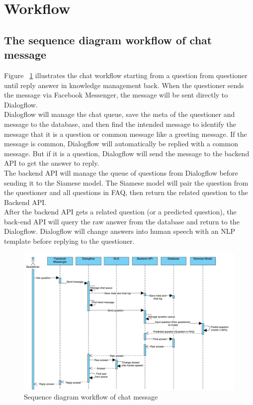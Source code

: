 \documentclass[12pt,oneside,openright,a4paper]{cpe-english-project}
\begin{document}
\pagebreak

\section{Workflow}
\subsection{The sequence diagram workflow of chat message}
Figure ~\ref*{fig:Sequence diagram workflow of chat message} illustrates the chat workflow starting from a question from questioner until reply answer in knowledge management back. When the questioner sends the message via Facebook Messenger, the message will be sent directly to Dialogflow.\\
Dialogflow will manage the chat queue, save the meta of the questioner and message to the database, and then find the intended message to identify the message that it is a question or common message like a greeting message. If the message is common, Dialogflow will automatically be replied with a common message. But if it is a question, Dialogflow will send the message to the backend API to get the answer to reply.\\
The backend API will manage the queue of questions from Dialogflow before sending it to the Siamese model. The Siamese model will pair the question from the questioner and all questions in FAQ, then return the related question to the Backend API.\\
After the backend API gets a related question (or a predicted question), the back-end API will query the raw answer from the database and return to the Dialogflow. Dialogflow will change answers into human speech with an NLP template before replying to the questioner.
\begin{figure}[!h]
	\includegraphics[width=14cm]{img/ch3/sequence diagram of chat message.jpg}
	\caption{Sequence diagram workflow of chat message}\label{fig:Sequence diagram workflow of chat message}
\end{figure}
\end{document}
